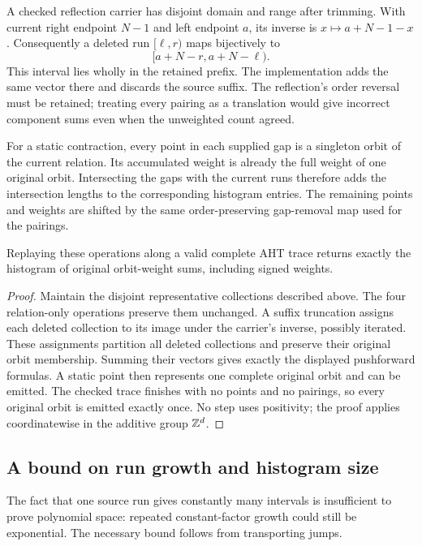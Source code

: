 A checked reflection carrier has disjoint domain and range after trimming.
With current right endpoint $N-1$ and left endpoint $a$, its inverse is
$x\mapsto a+N-1-x$. Consequently a deleted run $[\ell,r)$ maps bijectively to
\[
 [a+N-r,a+N-\ell).
\]
This interval lies wholly in the retained prefix. The implementation adds
the same vector there and discards the source suffix. The reflection's
order reversal must be retained; treating every pairing as a translation
would give incorrect component sums even when the unweighted count agreed.

For a static contraction, every point in each supplied gap is a singleton
orbit of the current relation. Its accumulated weight is already the full
weight of one original orbit. Intersecting the gaps with the current runs
therefore adds the intersection lengths to the corresponding histogram
entries. The remaining points and weights are shifted by the same
order-preserving gap-removal map used for the pairings.

\begin{proposition}
\label{prop:weighted-correct}
Replaying these operations along a valid complete AHT trace returns exactly
the histogram of original orbit-weight sums, including signed weights.
\end{proposition}
\begin{proof}
Maintain the disjoint representative collections described above. The four
relation-only operations preserve them unchanged. A suffix truncation assigns
each deleted collection to its image under the carrier's inverse, possibly
iterated. These assignments partition all deleted collections and preserve
their original orbit membership. Summing their vectors gives exactly the
displayed pushforward formulas. A static point then represents one complete
original orbit and can be emitted. The checked trace finishes with no points
and no pairings, so every original orbit is emitted exactly once. No step uses
positivity; the proof applies coordinatewise in the additive group $\mathbb Z^d$.
\end{proof}

\subsection{A bound on run growth and histogram size}

The fact that one source run gives constantly many intervals is insufficient
to prove polynomial space: repeated constant-factor growth could still be
exponential. The necessary bound follows from transporting jumps.

